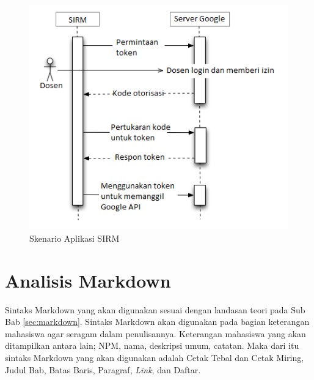 \begin{figure}[H]
\centering
\includegraphics[scale=1]{Gambar/skenarioaplikasisirm.png}
\caption[Skenario Aplikasi SIRM]{Skenario Aplikasi SIRM} 
\label{fig:skenarioaplikasisirm}
\end{figure}

\section{Analisis Markdown}
\label{sec:analisisMarkdown}
Sintaks Markdown yang akan digunakan sesuai dengan landasan teori pada Sub Bab
\ref{sec:markdown}. Sintaks Markdown akan digunakan pada bagian keterangan
mahasiswa agar seragam dalam penulisannya. Keterangan mahasiswa yang akan
ditampilkan antara lain; NPM, nama, deskripsi umum, catatan. Maka dari itu
sintaks Markdown yang akan digunakan adalah Cetak Tebal dan Cetak Miring, Judul
Bab, Batas Baris, Paragraf, {\it Link}, dan Daftar.

